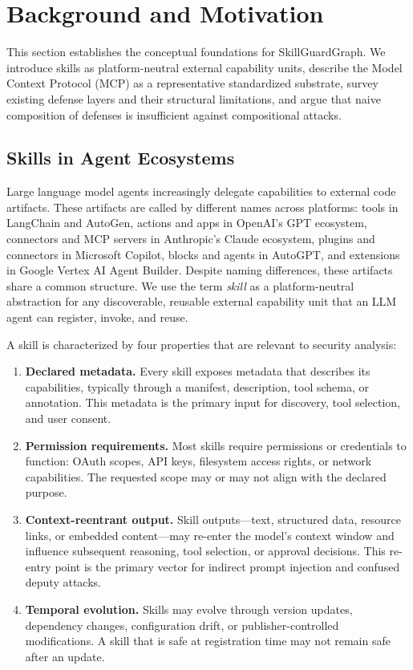 \section{Background and Motivation}
\label{sec:background}

This section establishes the conceptual foundations for SkillGuardGraph. We introduce skills as platform-neutral external capability units, describe the Model Context Protocol (MCP) as a representative standardized substrate, survey existing defense layers and their structural limitations, and argue that naive composition of defenses is insufficient against compositional attacks.

\subsection{Skills in Agent Ecosystems}
\label{sec:skills}

Large language model agents increasingly delegate capabilities to external code artifacts. These artifacts are called by different names across platforms: tools in LangChain and AutoGen, actions and apps in OpenAI's GPT ecosystem, connectors and MCP servers in Anthropic's Claude ecosystem, plugins and connectors in Microsoft Copilot, blocks and agents in AutoGPT, and extensions in Google Vertex AI Agent Builder. Despite naming differences, these artifacts share a common structure. We use the term \emph{skill} as a platform-neutral abstraction for any discoverable, reusable external capability unit that an LLM agent can register, invoke, and reuse.

A skill is characterized by four properties that are relevant to security analysis:

\begin{enumerate}
    \item \textbf{Declared metadata.} Every skill exposes metadata that describes its capabilities, typically through a manifest, description, tool schema, or annotation. This metadata is the primary input for discovery, tool selection, and user consent.
    \item \textbf{Permission requirements.} Most skills require permissions or credentials to function: OAuth scopes, API keys, filesystem access rights, or network capabilities. The requested scope may or may not align with the declared purpose.
    \item \textbf{Context-reentrant output.} Skill outputs---text, structured data, resource links, or embedded content---may re-enter the model's context window and influence subsequent reasoning, tool selection, or approval decisions. This re-entry point is the primary vector for indirect prompt injection and confused deputy attacks.
    \item \textbf{Temporal evolution.} Skills may evolve through version updates, dependency changes, configuration drift, or publisher-controlled modifications. A skill that is safe at registration time may not remain safe after an update.
\end{enumerate}


